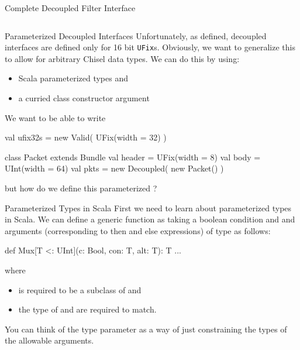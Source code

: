 \documentclass[xcolor=pdflatex,dvipsnames,table]{beamer}
\begin{document}
\begin{frame}[fragile]{Complete Decoupled Filter Interface}
\begin{columns}
\end{columns}
\end{frame}

\begin{frame}[fragile]{Parameterized Decoupled Interfaces}
Unfortunately, as defined, decoupled interfaces are defined only for 16 bit \verb+UFix+s.  
Obviously, we want to generalize this to allow for arbitrary Chisel data types.  
We can do this by using:
\begin{itemize}
\item Scala parameterized types and 
\item a curried class constructor argument
\end{itemize}

We want to be able to write
\begin{scala}
val ufix32s = new Valid( UFix(width = 32) )

class Packet extends Bundle {
  val header = UFix(width = 8)
  val body   = UInt(width = 64)
}
val pkts    = new Decoupled( new Packet() )
\end{scala}

\noindent
but how do we define this parameterized ?
\end{frame}

\begin{frame}[fragile]{Parameterized Types in Scala}
First we need to learn about parameterized types in Scala.
We can define a generic  function as taking a boolean condition and  and  arguments (corresponding to then and else expressions) of type  as follows:

\begin{scala}
def Mux[T <: UInt](c: Bool, con: T, alt: T): T { ... }
\end{scala}

\noindent
where 
\begin{itemize}
\item {} is required to be a subclass of  and 
\item the type of  and  are required to match.
\end{itemize}

\noindent
You can think of the type parameter as a way of just constraining the types of the allowable arguments.

\end{frame}
\end{document}
